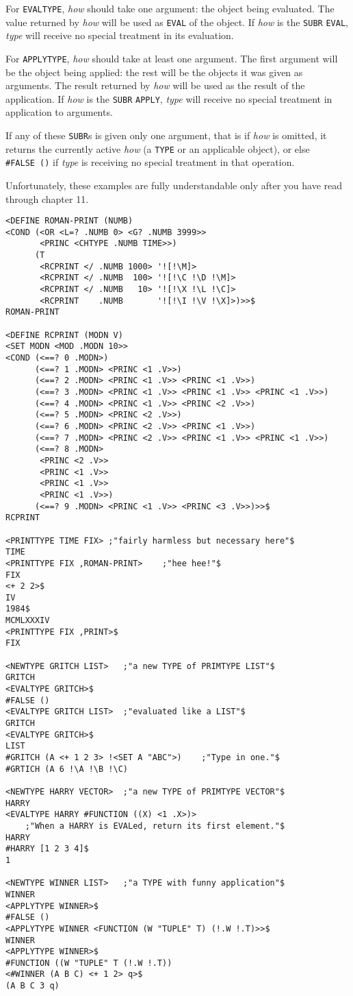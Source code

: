 \documentclass[a4paper,]{article}
\begin{document}
For \texttt{EVALTYPE}, \emph{how} should take one argument: the object being evaluated. The value returned by \emph{how}
will be used as \texttt{EVAL} of the object. If \emph{how} is the \texttt{SUBR} \texttt{EVAL},
\emph{type} will receive no special treatment in its evaluation.

For \texttt{APPLYTYPE}, \emph{how} should take at least one argument. The first argument will be the object being applied:
the rest will be the objects it was given as arguments. The result returned by \emph{how} will be used as the result of the
application. If \emph{how} is the \texttt{SUBR} \texttt{APPLY}, \emph{type} will receive no special
treatment in application to arguments.

If any of these \texttt{SUBR}s is given only one argument, that is if \emph{how} is omitted, it returns the currently
active \emph{how} (a \texttt{TYPE} or an applicable object), or else \texttt{\#FALSE\ ()} if \emph{type} is receiving no
special treatment in that operation.

Unfortunately, these examples are fully understandable only after you have read through chapter 11.

\begin{verbatim}
<DEFINE ROMAN-PRINT (NUMB)
<COND (<OR <L=? .NUMB 0> <G? .NUMB 3999>>
       <PRINC <CHTYPE .NUMB TIME>>)
      (T
       <RCPRINT </ .NUMB 1000> '![!\M]>
       <RCPRINT </ .NUMB  100> '![!\C !\D !\M]>
       <RCPRINT </ .NUMB   10> '![!\X !\L !\C]>
       <RCPRINT    .NUMB       '![!\I !\V !\X]>)>>$
ROMAN-PRINT

<DEFINE RCPRINT (MODN V)
<SET MODN <MOD .MODN 10>>
<COND (<==? 0 .MODN>)
      (<==? 1 .MODN> <PRINC <1 .V>>)
      (<==? 2 .MODN> <PRINC <1 .V>> <PRINC <1 .V>>)
      (<==? 3 .MODN> <PRINC <1 .V>> <PRINC <1 .V>> <PRINC <1 .V>>)
      (<==? 4 .MODN> <PRINC <1 .V>> <PRINC <2 .V>>)
      (<==? 5 .MODN> <PRINC <2 .V>>)
      (<==? 6 .MODN> <PRINC <2 .V>> <PRINC <1 .V>>)
      (<==? 7 .MODN> <PRINC <2 .V>> <PRINC <1 .V>> <PRINC <1 .V>>)
      (<==? 8 .MODN>
       <PRINC <2 .V>>
       <PRINC <1 .V>>
       <PRINC <1 .V>>
       <PRINC <1 .V>>)
      (<==? 9 .MODN> <PRINC <1 .V>> <PRINC <3 .V>>)>>$
RCPRINT

<PRINTTYPE TIME FIX> ;"fairly harmless but necessary here"$
TIME
<PRINTTYPE FIX ,ROMAN-PRINT>    ;"hee hee!"$
FIX
<+ 2 2>$
IV
1984$
MCMLXXXIV
<PRINTTYPE FIX ,PRINT>$
FIX

<NEWTYPE GRITCH LIST>   ;"a new TYPE of PRIMTYPE LIST"$
GRITCH
<EVALTYPE GRITCH>$
#FALSE ()
<EVALTYPE GRITCH LIST>  ;"evaluated like a LIST"$
GRITCH
<EVALTYPE GRITCH>$
LIST
#GRITCH (A <+ 1 2 3> !<SET A "ABC">)    ;"Type in one."$
#GRTICH (A 6 !\A !\B !\C)

<NEWTYPE HARRY VECTOR>  ;"a new TYPE of PRIMTYPE VECTOR"$
HARRY
<EVALTYPE HARRY #FUNCTION ((X) <1 .X>)>
    ;"When a HARRY is EVALed, return its first element."$
HARRY
#HARRY [1 2 3 4]$
1

<NEWTYPE WINNER LIST>   ;"a TYPE with funny application"$
WINNER
<APPLYTYPE WINNER>$
#FALSE ()
<APPLYTYPE WINNER <FUNCTION (W "TUPLE" T) (!.W !.T)>>$
WINNER
<APPLYTYPE WINNER>$
#FUNCTION ((W "TUPLE" T (!.W !.T))
<#WINNER (A B C) <+ 1 2> q>$
(A B C 3 q)
\end{verbatim}
\end{document}
